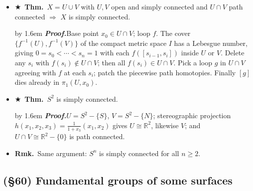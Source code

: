 \documentclass[12pt,a4paper]{article}
\newcommand{\Thm}{\textbf{Thm.}~}
\newcommand{\Rmk}{\textbf{Rmk.}~}
\newcommand{\Key}{$\bigstar$~}                  %
\newcommand{\Pf}[1]{%
  \par\addvspace{7pt}\nopagebreak
  \begingroup
    \advance\leftskip by 1.6em
    \parindent=0pt \small\color{prf}%
    \textbf{\textit{Proof.}}\enspace #1\par
  \endgroup
  \addvspace{9pt}}
\newenvironment{BL}%
  {\begin{itemize}[leftmargin=1.4em,labelsep=0.55em,itemsep=11pt,topsep=11pt,parsep=0pt]}%
  {\end{itemize}}
\newcommand{\RR}{\mathbb{R}}
\newcommand{\imp}{\Rightarrow}
\begin{document}
\begin{BL}
\item \Key\Thm $X=U\cup V$ with $U,V$ open and simply connected and $U\cap V$ path connected
      $\imp$ $X$ is simply connected.
\Pf{Base point $x_0\in U\cap V$; loop $f$. The cover $\{f^{-1}(U),f^{-1}(V)\}$ of the compact
metric space $I$ has a Lebesgue number, giving $0=s_0<\cdots<s_n=1$ with each
$f([s_{i-1},s_i])$ inside $U$ or $V$. Delete any $s_i$ with $f(s_i)\notin U\cap V$;
then all $f(s_i)\in U\cap V$. Pick a loop $g$ in $U\cap V$ agreeing with $f$ at each $s_i$;
patch the piecewise path homotopies. Finally $[g]$ dies already in $\pi_1(U,x_0)$.}
\item \Key\Thm $S^2$ is simply connected.
\Pf{$U=S^2-\{S\}$, $V=S^2-\{N\}$; stereographic projection
$h(x_1,x_2,x_3)=\frac{1}{1+x_3}(x_1,x_2)$ gives $U\cong\RR^2$, likewise $V$;
and $U\cap V\cong\RR^2-\{0\}$ is path connected.}
\item \Rmk Same argument: $S^n$ is simply connected for all $n\ge2$.
\end{BL}

\subsection{(\S60) Fundamental groups of some surfaces}
\end{document}
